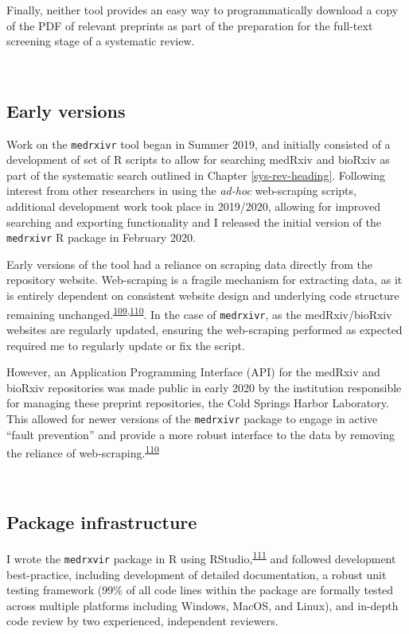 \documentclass[a4paper, twoside]{templates/ociamthesis}
\begin{document}
Finally, neither tool provides an easy way to programmatically download a copy of the PDF of relevant preprints as part of the preparation for the full-text screening stage of a systematic review.

~

\hypertarget{early-versions}{%
\subsection{Early versions}\label{early-versions}}

Work on the \texttt{medrxivr} tool began in Summer 2019, and initially consisted of a development of set of R scripts to allow for searching medRxiv and bioRxiv as part of the systematic search outlined in Chapter \ref{sys-rev-heading}. Following interest from other researchers in using the \emph{ad-hoc} web-scraping scripts, additional development work took place in 2019/2020, allowing for improved searching and exporting functionality and I released the initial version of the \texttt{medrxivr} R package in February 2020.

Early versions of the tool had a reliance on scraping data directly from the repository website. Web-scraping is a fragile mechanism for extracting data, as it is entirely dependent on consistent website design and underlying code structure remaining unchanged.\textsuperscript{\protect\hyperlink{ref-shaw2002}{109},\protect\hyperlink{ref-laprie1992}{110}}. In the case of \texttt{medrxivr}, as the medRxiv/bioRxiv websites are regularly updated, ensuring the web-scraping performed as expected required me to regularly update or fix the script.

However, an Application Programming Interface (API) for the medRxiv and bioRxiv repositories was made public in early 2020 by the institution responsible for managing these preprint repositories, the Cold Springs Harbor Laboratory. This allowed for newer versions of the \texttt{medrxivr} package to engage in active ``fault prevention'' and provide a more robust interface to the data by removing the reliance of web-scraping.\textsuperscript{\protect\hyperlink{ref-laprie1992}{110}}

~

\hypertarget{package-infrastructure}{%
\subsection{Package infrastructure}\label{package-infrastructure}}

I wrote the \texttt{medrxvir} package in R using RStudio,\textsuperscript{\protect\hyperlink{ref-rcoreteam2019}{111}} and followed development best-practice, including development of detailed documentation, a robust unit testing framework (99\% of all code lines within the package are formally tested across multiple platforms including Windows, MacOS, and Linux), and in-depth code review by two experienced, independent reviewers.
\end{document}
